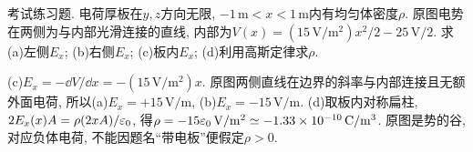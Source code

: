 \begin{exercise}
考试练习题. 电荷厚板在$y,z$方向无限, $-1\,\mathrm m<x<1\,\mathrm m$内有均匀体密度$\rho$. 原图电势在两侧为与内部光滑连接的直线, 内部为$V(x)=(15\,\mathrm{V/m^2})x^2/2-25\,\mathrm V/2$. 求(a)左侧$E_x$; (b)右侧$E_x$; (c)板内$E_x$; (d)利用高斯定律求$\rho$.
\end{exercise}
\begin{solution}
(c)$E_x=-\dd V/\dd x=-(15\,\mathrm{V/m^2})x$. 原图两侧直线在边界的斜率与内部连接且无额外面电荷, 所以(a)$E_x=+15\,\mathrm{V/m}$, (b)$E_x=-15\,\mathrm{V/m}$. (d)取板内对称扁柱, $2E_x(x)A=\rho(2xA)/\varepsilon_0$, 得$\rho=-15\varepsilon_0\,\mathrm{V/m^2}\simeq-1.33\times10^{-10}\,\mathrm{C/m^3}$. 原图是势的谷, 对应负体电荷, 不能因题名“带电板”便假定$\rho>0$.
\end{solution}
